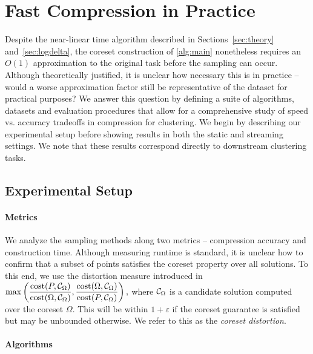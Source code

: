 \section{Fast Compression in Practice}

Despite the near-linear time algorithm described in Sections~\ref{sec:theory} and~\ref{sec:logdelta}, the coreset construction of \cref{alg:main} nonetheless
requires an $O(1)$ approximation to the original task before the sampling can occur. Although theoretically justified, it is unclear how necessary this is in
practice -- would a worse approximation factor still be representative of the dataset for practical purposes? We answer this question by defining a suite of
algorithms, datasets and evaluation procedures that allow for a comprehensive study of speed vs. accuracy tradeoffs in compression for clustering.  We begin by
describing our experimental setup before showing results in both the static and streaming settings.  We note that these results correspond directly to
downstream clustering tasks.

\subsection{Experimental Setup}
\paragraph*{Metrics}
\label{sssec:metrics}

We analyze the sampling methods along two metrics -- compression accuracy and construction time. Although measuring runtime is standard, it is unclear how to
confirm that a subset of points satisfies the coreset property over all solutions. To this end, we use the distortion measure introduced in~\cite{chrisESA} $
\max \left( \dfrac{\operatorname{cost}(P, \mathcal C_{\Omega})}{\operatorname{cost}(\Omega, \mathcal C_{\Omega})}, \dfrac{\operatorname{cost}(\Omega, \mathcal C_{\Omega})}{\operatorname{cost}(P, \mathcal C_{\Omega})} \right),$ where
$\mathcal C_{\Omega}$ is a candidate solution computed over the coreset $\Omega$. This will be within $1+\varepsilon$ if the coreset guarantee is satisfied
but may be unbounded otherwise.  We refer to this as the \emph{coreset distortion}.

\paragraph*{Algorithms}
\label{ssec:algorithms}

